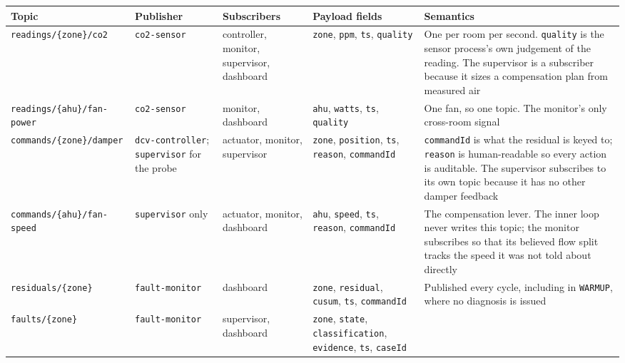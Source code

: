 \begin{longtable}[]{@{}
  >{\raggedright\arraybackslash}p{}
  >{\raggedright\arraybackslash}p{}
  >{\raggedright\arraybackslash}p{}
  >{\raggedright\arraybackslash}p{}
  >{\raggedright\arraybackslash}p{}@{}}
\toprule
\textbf{Topic} & \textbf{Publisher} & \textbf{Subscribers} & \textbf{Payload fields} &
\textbf{Semantics} \\
\midrule
\endhead
\texttt{readings/\{zone\}/co2} & \texttt{co2-sensor} & controller, monitor, supervisor,
dashboard &
\texttt{zone}, \texttt{ppm}, \texttt{ts}, \texttt{quality} & One per room per second.
\texttt{quality} is the sensor process's own judgement of the reading. The supervisor is a
subscriber because it sizes a compensation plan from measured air \\
\texttt{readings/\{ahu\}/\allowbreak fan-power} & \texttt{co2-sensor} & monitor, dashboard & \texttt{ahu},
\texttt{watts}, \texttt{ts}, \texttt{quality} & One fan, so one topic. The monitor's only
cross-room signal \\
\texttt{commands/\{zone\}/damper} & \texttt{dcv-controller}; \texttt{supervisor} for the probe &
actuator, monitor, supervisor & \texttt{zone}, \texttt{position}, \texttt{ts}, \texttt{reason},
\texttt{commandId} & \texttt{commandId} is what the residual is keyed to; \texttt{reason} is
human-readable so every action is auditable. The supervisor subscribes to its own topic because
it has no other damper feedback \\
\texttt{commands/\{ahu\}/\allowbreak fan-speed} & \texttt{supervisor} only & actuator, monitor,
dashboard & \texttt{ahu},
\texttt{speed}, \texttt{ts}, \texttt{reason}, \texttt{commandId} & The compensation lever. The
inner loop never writes this topic; the monitor subscribes so that its believed flow split tracks
the speed it was not told about directly \\
\texttt{residuals/\{zone\}} & \texttt{fault-monitor} & dashboard & \texttt{zone},
\texttt{residual}, \texttt{cusum}, \texttt{ts}, \texttt{commandId} & Published every cycle,
including in \texttt{WARMUP}, where no diagnosis is issued \\
\texttt{faults/\{zone\}} & \texttt{fault-monitor} & supervisor, dashboard & \texttt{zone},
\texttt{state}, \texttt{classification}, \texttt{evidence}, \texttt{ts}, \texttt{caseId} &

\end{longtable}
